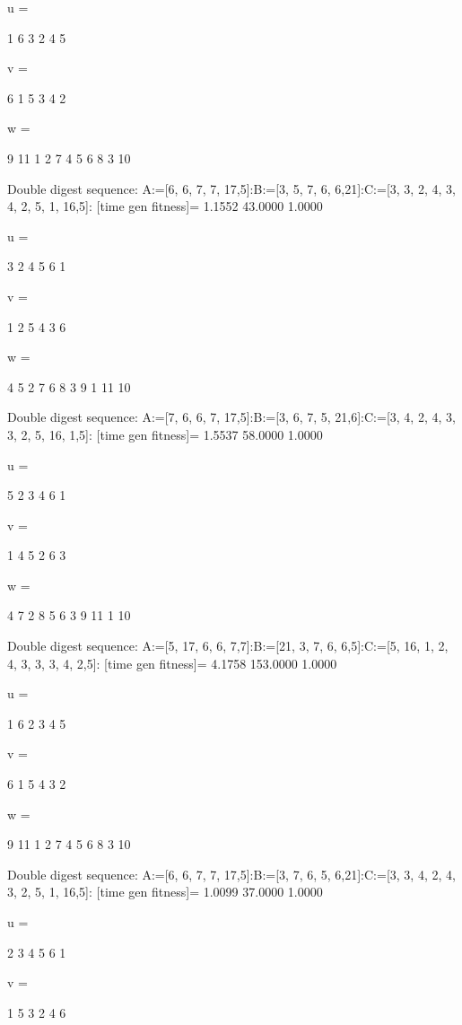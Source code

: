 u =

     1     6     3     2     4     5


v =

     6     1     5     3     4     2


w =

     9    11     1     2     7     4     5     6     8     3    10

Double digest sequence:
A:=[6, 6, 7, 7, 17,5]:B:=[3, 5, 7, 6, 6,21]:C:=[3, 3, 2, 4, 3, 4, 2, 5, 1, 16,5]:
[time gen fitness]=
    1.1552   43.0000    1.0000


u =

     3     2     4     5     6     1


v =

     1     2     5     4     3     6


w =

     4     5     2     7     6     8     3     9     1    11    10

Double digest sequence:
A:=[7, 6, 6, 7, 17,5]:B:=[3, 6, 7, 5, 21,6]:C:=[3, 4, 2, 4, 3, 3, 2, 5, 16, 1,5]:
[time gen fitness]=
    1.5537   58.0000    1.0000


u =

     5     2     3     4     6     1


v =

     1     4     5     2     6     3


w =

     4     7     2     8     5     6     3     9    11     1    10

Double digest sequence:
A:=[5, 17, 6, 6, 7,7]:B:=[21, 3, 7, 6, 6,5]:C:=[5, 16, 1, 2, 4, 3, 3, 3, 4, 2,5]:
[time gen fitness]=
    4.1758  153.0000    1.0000


u =

     1     6     2     3     4     5


v =

     6     1     5     4     3     2


w =

     9    11     1     2     7     4     5     6     8     3    10

Double digest sequence:
A:=[6, 6, 7, 7, 17,5]:B:=[3, 7, 6, 5, 6,21]:C:=[3, 3, 4, 2, 4, 3, 2, 5, 1, 16,5]:
[time gen fitness]=
    1.0099   37.0000    1.0000


u =

     2     3     4     5     6     1


v =

     1     5     3     2     4     6


